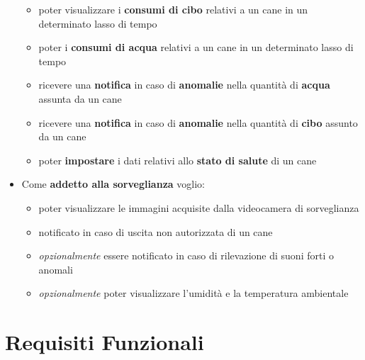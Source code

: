 \begin{itemize}
\begin{itemize}
                    \item poter visualizzare i \textbf{consumi di cibo} relativi a un cane in un determinato lasso di tempo
                    \item poter i \textbf{consumi di acqua} relativi a un cane in un determinato lasso di tempo
                    \item ricevere una \textbf{notifica} in caso di \textbf{anomalie} nella quantità di \textbf{acqua} assunta da un cane
                    \item ricevere una \textbf{notifica} in caso di \textbf{anomalie} nella quantità di \textbf{cibo} assunto da un cane
                    \item poter \textbf{impostare} i dati relativi allo \textbf{stato di salute} di un cane
            \end{itemize}

            \item Come \textbf{addetto alla sorveglianza}
            voglio:
            \begin{itemize}
                \item poter visualizzare le immagini acquisite dalla videocamera di sorveglianza
                \item notificato in caso di uscita non autorizzata di un cane
                \item \textit{opzionalmente} essere notificato in caso di rilevazione di suoni forti o anomali
                \item \textit{opzionalmente} poter visualizzare l’umidità e la temperatura ambientale 
            \end{itemize}
        \end{itemize}
	    
	\section{Requisiti Funzionali} %

